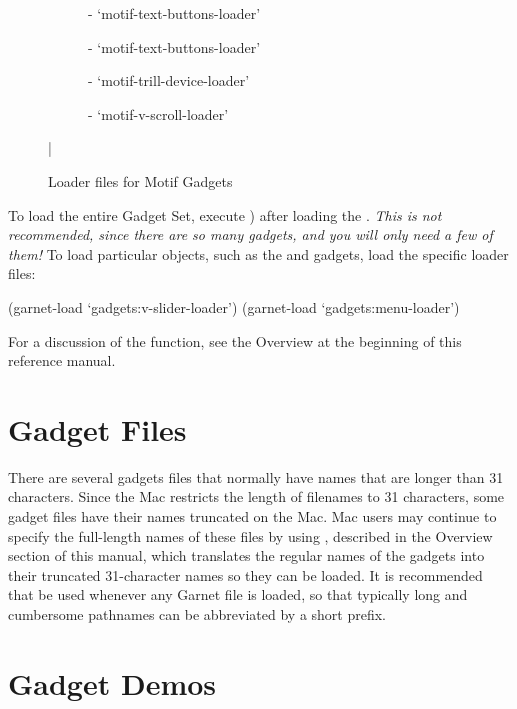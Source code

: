 \begin{figure}
\begin{description}
\item[]  - `motif-text-buttons-loader'

\item[]  - `motif-text-buttons-loader'

\item[]  - `motif-trill-device-loader'

\item[]  - `motif-v-scroll-loader'

\end{description}
\caption{Loader files for Motif Gadgets}
\bar{}
\end{figure}

To load the entire Gadget Set, execute
) after loading the
. {\it This is not recommended, since there are so
many gadgets, and you will only need a few of them!}  To load
particular objects, such as the  and  gadgets,
load the specific loader files:
\begin{programexample}
(garnet-load `gadgets:v-slider-loader')
(garnet-load `gadgets:menu-loader')
\end{programexample}
For a discussion of the  function, see the Overview at the
beginning of this reference manual.

\section{Gadget Files}

There are several gadgets files that
normally have names that are longer than 31 characters.  Since the Mac
restricts the length of filenames to 31 characters, some gadget files have
their names truncated on the Mac.  Mac users may
continue to specify the full-length names of these files by using
, described in the Overview section of this manual,
which translates the regular names of the gadgets into their truncated
31-character names so they can be loaded.  It is recommended that
 be used
whenever any Garnet file is loaded, so that typically long and cumbersome
pathnames can be abbreviated by a short prefix.

\section{Gadget Demos}

